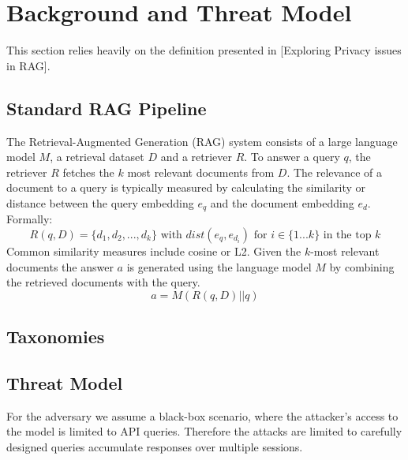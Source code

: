 \chapter{Background and Threat Model}\label{chapter:background}
This section relies heavily on the definition presented in [Exploring Privacy issues in RAG].
\section{Standard RAG Pipeline}
The Retrieval-Augmented Generation (RAG) system consists of a large language model $M$, a retrieval dataset $D$ and a retriever $R$. To answer a query $q$, the retriever $R$ fetches the $k$ most relevant documents from $D$. The relevance of a document to a query is typically measured by calculating the similarity or distance between the query embedding $e_q$ and the document embedding $e_d$. Formally:
\[R(q,D) = \{d_1,d_2,..., d_k\} \mbox{ with } dist(e_q, e_{d_i}) \mbox{ for } i \in \{1...k\} \mbox{ in the top } k\]
Common similarity measures include cosine or L2. Given the $k$-most relevant documents the answer $a$ is generated using the language model $M$ by combining the retrieved documents with the query. $$a = M(R(q,D)\vert\vert q)$$
\section{Taxonomies}

\section{Threat Model} 
For the adversary we assume a black-box scenario, where the attacker's access to the model is limited to API queries. Therefore the attacks are limited to carefully designed queries accumulate responses over multiple sessions.
